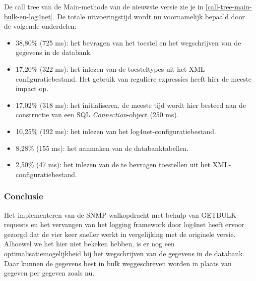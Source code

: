 De call tree van de Main-methode van de nieuwste versie zie je in \cref{call-tree-main-bulk-en-log4net}.
De totale uitvoeringstijd wordt nu voornamelijk bepaald door de volgende onderdelen:

\begin{itemize}
	\item 38,80\% (725 ms): het bevragen van het toestel en het wegschrijven van de gegevens in de databank.
	\item 17,20\% (322 ms): het inlezen van de toesteltypes uit het XML-configuratiebestand.
		Het gebruik van reguliere expressies heeft hier de meeste impact op.
	\item 17,02\% (318 ms): het initialiseren,
		de meeste tijd wordt hier besteed aan de constructie van een SQL \textit{Connection}-object (250 ms).
	\item 10,25\% (192 ms): het inlezen van het log4net-configuratiebestand.
	\item 8,28\% (155 ms): het aanmaken van de databanktabellen.
	\item 2,50\% (47 ms): het inlezen van de te bevragen toestellen uit het XML-configuratiebestand.
\end{itemize}

\subsubsection{Conclusie}

Het implementeren van de SNMP walkopdracht met behulp van GETBULK-requests en het vervangen van het logging framework
door log4net heeft ervoor gezorgd dat de \nwmretriever{} vier keer sneller werkt in vergelijking met de originele versie.
Alhoewel we het hier niet bekeken hebben, is er nog een optimalisatiemogelijkheid bij het wegschrijven van de gegevens in de databank.
Daar kunnen de gegevens best in bulk weggeschreven worden in plaats van gegeven per gegeven zoals nu.

